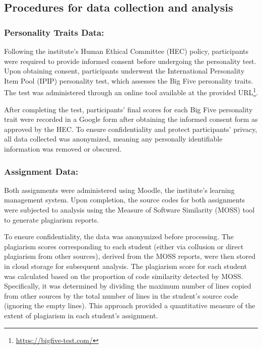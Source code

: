 \subsection{Procedures for data collection and analysis}
\subsubsection{Personality Traits Data:} Following the institute's Human Ethical Committee (HEC) policy, participants were required to provide informed consent before undergoing the personality test. Upon obtaining consent, participants underwent the International Personality Item Pool (IPIP) personality test, which assesses the Big Five personality traits. The test was administered through an online tool available at the provided URL\footnote{\url{https://bigfive-test.com/}}.

After completing the test, participants' final scores for each Big Five personality trait were recorded in a Google form after obtaining the informed consent form as approved by the HEC. To ensure confidentiality and protect participants' privacy, all data collected was anonymized, meaning any personally identifiable information was removed or obscured.

\subsubsection{Assignment Data:} 
Both assignments were administered using Moodle, the institute's learning management system. Upon completion, the source codes for both assignments were subjected to analysis using the Measure of Software Similarity (MOSS) tool to generate plagiarism reports.

To ensure confidentiality, the data was anonymized before processing. The plagiarism scores corresponding to each student (either via collusion or direct plagiarism from other sources), derived from the MOSS reports, were then stored in cloud storage for subsequent analysis. The plagiarism score for each student was calculated based on the proportion of code similarity detected by MOSS. Specifically, it was determined by dividing the maximum number of lines copied from other sources by the total number of lines in the student's source code (ignoring the empty lines). This approach provided a quantitative measure of the extent of plagiarism in each student's assignment.